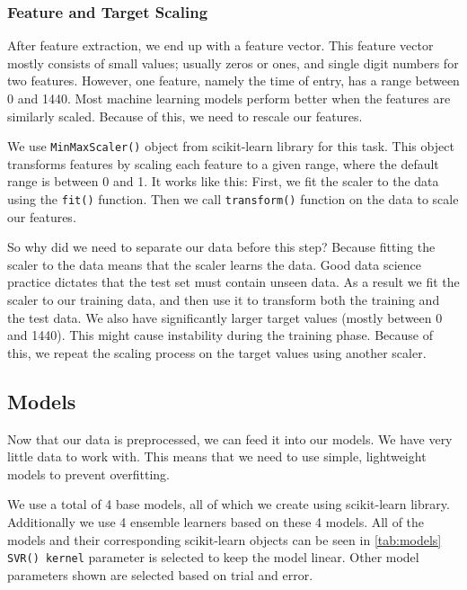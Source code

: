 \subsubsection{Feature and Target Scaling}
After feature extraction, we end up with a feature vector.
This feature vector mostly consists of small values; usually zeros or ones, and single digit numbers for two features.
However, one feature, namely the time of entry, has a range between 0 and 1440.
Most machine learning models perform better when the features are similarly scaled.
Because of this, we need to rescale our features.

We use \texttt{MinMaxScaler()} object from scikit-learn library for this task.
This object transforms features by scaling each feature to a given range, where the default range is between 0 and 1.
It works like this: First, we fit the scaler to the data using the \texttt{fit()} function.
Then we call \texttt{transform()} function on the data to scale our features.

So why did we need to separate our data before this step?
Because fitting the scaler to the data means that the scaler learns the data.
Good data science practice dictates that the test set must contain unseen data.
As a result we fit the scaler to our training data, and then use it to transform both the training and the test data.
We also have significantly larger target values (mostly between 0 and 1440).
This might cause instability during the training phase.
Because of this, we repeat the scaling process on the target values using another scaler.

\subsection{Models}
Now that our data is preprocessed, we can feed it into our models.
We have very little data to work with.
This means that we need to use simple, lightweight models to prevent overfitting.

We use a total of 4 base models, all of which we create using scikit-learn library.
Additionally we use 4 ensemble learners based on these 4 models.
All of the models and their corresponding scikit-learn objects can be seen in \autoref{tab:models}
\texttt{SVR() kernel} parameter is selected to keep the model linear.
Other model parameters shown are selected based on trial and error.

